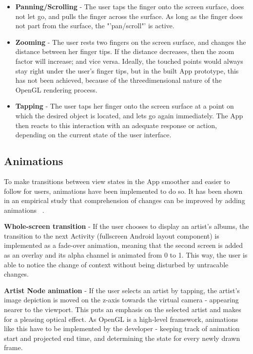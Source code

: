 \begin{itemize}
	\item \textbf{Panning/Scrolling} - The user taps the finger onto the screen surface, does not let 
	go, and pulls the finger across the surface. As long as the finger does not part from the surface, 
	the "'pan/scroll"' is active.
	\item \textbf{Zooming} - The user rests two fingers on the screen surface, and changes the distance
	between her finger tips. If the distance decreases, then the zoom factor will increase; and vice versa.
	Ideally, the touched points would always stay right under the user's finger tips, but in the built
	App prototype, this has not been achieved, because of the threedimensional nature of the OpenGL
	rendering process.
	\item \textbf{Tapping} - The user taps her finger onto the screen surface at a point on which the
	desired object is located, and lets go again immediately. The App then reacts to this interaction
	with an adequate response or action, depending on the current state of the user interface.
\end{itemize}

\subsection{Animations}

To make transitions between view states in the App smoother and easier to follow for users, animations have been implemented to do so. It has been shown in an empirical study that comprehension of changes can be improved by adding animations ~\cite{Schlienger:2007}.

\textbf{Whole-screen transition} - If the user chooses to display an artist's albums, the transition to the next Activity (fullscreen Android layout component) is implemented as a fade-over animation, meaning that the second screen is added as an overlay and its alpha channel is animated from 0 to 1. This way, the user is able to notice the change of context without being disturbed by untracable changes.

\textbf{Artist Node animation} - If the user selects an artist by tapping, the artist's image depiction is moved on the z-axis towards the virtual camera - appearing nearer to the viewport. This puts an emphasis on the selected artist and makes for a pleasing optical effect. As OpenGL is a high-level framework, animations like this have to be implemented by the developer - keeping track of animation start and projected end time, and determining the state for every newly drawn frame.

